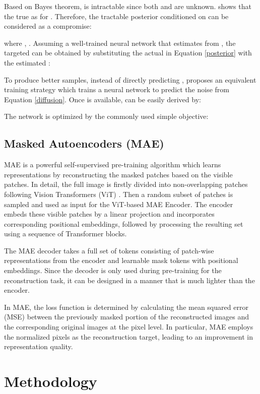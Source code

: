 \documentclass{article} \usepackage{iclr2024_conference,times}
\begin{document}
Based on Bayes theorem,  is intractable since both  and  are unknown. \citet{DBLP:conf/iclr/0011SKKEP21} shows that the true  as  for . Therefore, the tractable posterior conditioned on  can be considered as a compromise:

where , . Assuming a well-trained neural network  that estimates  from , the targeted  can be obtained by substituting the actual  in Equation \ref{posterior} with the estimated :


To produce better samples, instead of directly predicting , \citet{DBLP:conf/nips/HoJA20} proposes an equivalent training strategy which trains a neural network  to predict the noise  from Equation \ref{diffusion}. Once  is available,  can be easily derived by:

The network is optimized by the commonly used simple objective:


\subsection{Masked Autoencoders (MAE)} 

MAE is a powerful self-supervised pre-training algorithm which learns representations by reconstructing the masked patches based on the visible patches. In detail, the full image is firstly divided into non-overlapping patches following Vision Transformers (ViT) \citep{DBLP:conf/iclr/DosovitskiyB0WZ21}. Then a random subset of patches is sampled and used as input for the ViT-based MAE Encoder. The encoder embeds these visible patches by a linear projection and incorporates corresponding positional embeddings, followed by processing the resulting set using a sequence of Transformer blocks.

The MAE decoder takes a full set of tokens consisting of patch-wise representations from the encoder and learnable mask tokens with positional embeddings. Since the decoder is only used during pre-training for the reconstruction task, it can be designed in a manner that is much lighter than the encoder. 

In MAE, the loss function is determined by calculating the mean squared error (MSE) between the previously masked portion of the reconstructed images and the corresponding original images at the pixel level. In particular, MAE employs the normalized pixels as the reconstruction target, leading to an improvement in representation quality.



\section{Methodology}
\end{document}
